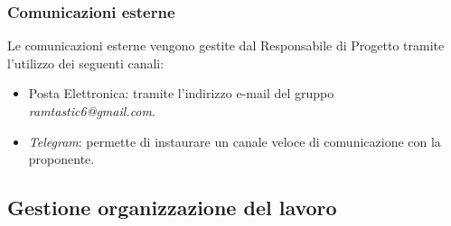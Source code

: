 \subsubsection{Comunicazioni esterne}
Le comunicazioni esterne vengono gestite dal Responsabile di Progetto tramite l’utilizzo dei seguenti
canali:
\begin{itemize}
    \item  Posta Elettronica: tramite l’indirizzo e-mail del gruppo \textit{ramtastic6@gmail.com}.
    \item  \textit{Telegram}: permette di instaurare un canale veloce di comunicazione con la proponente.
\end{itemize}

\subsection{Gestione organizzazione del lavoro}
